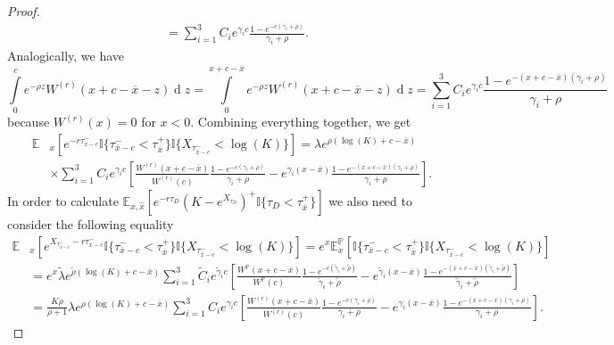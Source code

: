 \documentclass[10pt]{amsart}
\def\E{{\mathbb{E}}}
\def\Eq{{\mathbb{E}
		_{x,\hat{x}}}}
\def\P{{\mathbb{P}}}
\def \R{{{\rm I{\!}\rm R}}}
\def \I{{\mathbb{I}}}
\newcommand{\dx}{\operatorname{d}\!}
\def\P{{\mathbb P}} \def\le{\left} \def\ri{\right} \def\i{\infty}
\def\E{{\mathbb E}} \def\PP{\mc P} \def\Z{{\mathbb Z}} \def\R{{\mathbb R}}
\begin{document}
\begin{proof}
\begin{align*}
				\nonumber & = \sum_{i=1}^3 C_i e^{\gamma_i c} \frac{1 - e^{-c(\gamma_i+\rho)}}{\gamma_i + \rho}.
			\end{align*}
			Analogically, we have
			\begin{equation*}
				\int\limits_{0}^{c} e^{-\rho z} W^{(r)}(x+c-\overline{x}-z) \dx z = \int\limits_{0}^{x+c-\overline{x}} e^{-\rho z} W^{(r)}(x+c-\overline{x}-z) \dx z = \sum_{i=1}^3 C_i e^{\gamma_i c} \frac{1 - e^{-(x+c-\overline{x})(\gamma_i+\rho)}}{\gamma_i + \rho}
			\end{equation*}
			because $W^{(r)}(x) = 0$ for $x < 0$. Combining everything together, we get
			\begin{align*}
				\E&_x \left[ e^{-r\tau_{\overline{x}-c}^- }
				\I \{ \tau_{\overline{x}-c}^- < \tau_{\overline{x}}^+ \}
				\I \{ X_{\tau_{\overline{x}-c}^- } < \log(K)\}
				\right] = \lambda e^{\rho (\log(K)+c - \overline{x})} \\
				\nonumber &\times \sum_{i=1}^3 C_i e^{\gamma_i c} \left[ \frac{W^{(r)}(x+c-\overline{x})}{W^{(r)}(c)}\frac{1 - e^{-c(\gamma_i+\rho)}}{\gamma_i + \rho} - e^{\gamma_i(x - \overline{x})}\frac{1 - e^{-(x+c-\overline{x})(\gamma_i+\rho)}}{\gamma_i + \rho} \right].
			\end{align*}
			In order to calculate $\Eq\left[ e^{-r\tau_D} \left( K - e^{X_{\tau_D}} \right)^+ \I
			\{ \tau_D < \tau_{\overline{x}}^+ \} \right]$ we also need to consider the following equality
			\begin{align*}
				\E&_x \left[ e^{X_{\tau_{\overline{x}-c}^- }-r\tau_{\overline{x}-c}^- }
				\I \{ \tau_{\overline{x}-c}^- < \tau_{\overline{x}}^+ \}
				\I \{ X_{\tau_{\overline{x}-c}^- } < \log(K)\}
				\right] = e^x\E^\P_x \left[
				\I \{ \tau_{\overline{x}-c}^- < \tau_{\overline{x}}^+ \}
				\I \{ X_{\tau_{\overline{x}-c}^- } < \log(K)\}
				\right] \\
				&= e^x\tilde{\lambda} e^{\tilde{\rho} (\log(K)+c - \overline{x})} \sum_{i=1}^3 \tilde{C}_i e^{\tilde{\gamma}_i c} \left[ \frac{W^{\P}(x+c-\overline{x})}{W^{\P}(c)}\frac{1 - e^{-c(\tilde{\gamma}_i+\tilde{\rho})}}{\tilde{\gamma}_i + \tilde{\rho}} - e^{\tilde{\gamma}_i(x - \overline{x})}\frac{1 - e^{-(x+c-\overline{x})(\tilde{\gamma}_i+\tilde{\rho})}}{\tilde{\gamma}_i + \tilde{\rho}} \right] \\
				& = \frac{K\rho}{\rho + 1} \lambda e^{\rho (\log(K)+c - \overline{x})} \sum_{i=1}^3 C_i e^{\gamma_i c} \left[ \frac{W^{(r)}(x+c-\overline{x})}{W^{(r)}(c)}\frac{1 - e^{-c(\gamma_i+\rho)}}{\gamma_i + \rho} - e^{\gamma_i(x - \overline{x})}\frac{1 - e^{-(x+c-\overline{x})(\gamma_i+\rho)}}{\gamma_i + \rho} \right].

\end{align*}
\end{proof}
\end{document}
